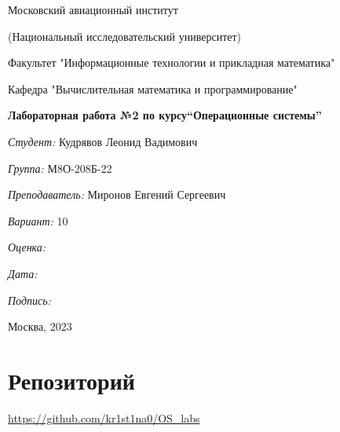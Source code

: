 \documentclass[a4paper, 12pt]{article}
\begin{document}
\thispagestyle{empty}	
\begin{center}
	Московский авиационный институт
	
	(Национальный исследовательский университет)
	
	Факультет "Информационные технологии и прикладная математика"
	
	Кафедра "Вычислительная математика и программирование"
	
\end{center}
\vspace{40ex}
\begin{center}
	\textbf{\large{Лабораторная работа №2 по курсу\linebreak \textquotedblleft Операционные системы\textquotedblright}}
\end{center}
\vspace{35ex}
\begin{flushright}
	\textit{Студент: } Кудрявов Леонид Вадимович
	
	\vspace{2ex}
	\textit{Группа: } М8О-208Б-22
	
	\vspace{2ex}
	\textit{Преподаватель: } Миронов Евгений Сергеевич
	
	\vspace{2ex}
	\textit{Вариант: } 10
	
	\vspace{2ex}
	\textit{Оценка: } \underline{\quad\quad\quad\quad\quad\quad}
	
	 \vspace{2ex}
	\textit{Дата: } \underline{\quad\quad\quad\quad\quad\quad}
	
	\vspace{2ex}
	\textit{Подпись: } \underline{\quad\quad\quad\quad\quad\quad}
	
\end{flushright}

\vspace{5ex}

\begin{vfill}
	\begin{center}
		Москва, 2023
	\end{center}	
\end{vfill}
\newpage

\begingroup
\color{black}
\tableofcontents\newpage
\endgroup

\section{Репозиторий}
\href{https://github.com/kr1st1na0/OS\_labs}{https://github.com/kr1st1na0/OS\_labs}
\end{document}
